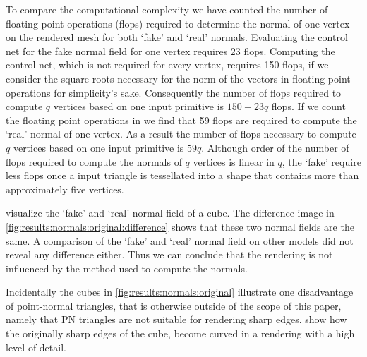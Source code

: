 To compare the computational complexity we have counted the number of floating point operations (flops) required to determine the normal of one vertex on the rendered mesh for both `fake' and `real' normals. 
Evaluating the control net for the fake normal field for one vertex requires 23 flops. Computing the control net, which is not required for every vertex, requires 150 flops, if we consider the square roots necessary for the norm of the vectors in  floating point operations for simplicity's sake. Consequently the number of flops required to compute $q$ vertices based on one input primitive is $150 + 23q$ flops.
If we count the floating point operations in  we find that 59 flops are required to compute the `real' normal of one vertex. As a result the number of flops necessary to compute $q$ vertices based on one input primitive is $59q$. 
Although order of the number of flops required to compute the normals of $q$ vertices is linear in $q$, the `fake' require less flops once a input triangle is tessellated into a shape that contains more than approximately five vertices. 

 visualize the `fake' and `real' normal field of a cube. The difference image in \cref{fig:results:normals:original:difference} shows that these two normal fields are the same. A comparison of the `fake' and `real' normal field on other models did not reveal any difference either.  Thus we can conclude that the rendering is not influenced by the method used to compute the normals. 

Incidentally the cubes in \cref{fig:results:normals:original} illustrate one disadvantage of point-normal triangles, that is otherwise outside of the scope of this paper, namely that PN triangles are not suitable for rendering sharp edges.  show how the originally sharp edges of the cube, become curved in a rendering with a high level of detail.